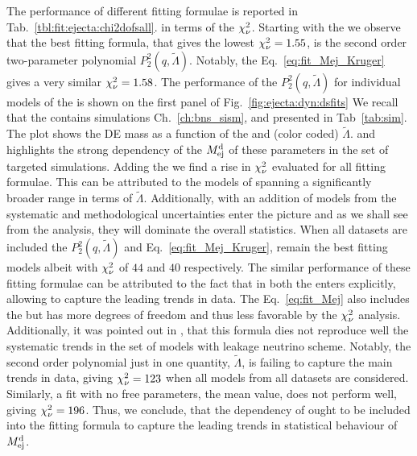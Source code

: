 The performance of different fitting formulae is reported in  
Tab.~\ref{tbl:fit:ejecta:chi2dofsall}.
in terms of the $\chi_{\nu}^2$.
Starting with the \DSrefset{} we observe that the best fitting formula, that gives the 
lowest $\chi_{\nu}^2=1.55$, is the second order two-parameter polynomial $P_2^2(q,\tilde{\Lambda})$.
Notably, the Eq.~\eqref{eq:fit_Mej_Kruger} gives a very similar $\chi_{\nu}^2=1.58$.
The performance of the $P_2^2(q,\tilde{\Lambda})$ for individual models of the \DSrefset{} 
is shown on the first panel of Fig.~\ref{fig:ejecta:dyn:dsfits}
We recall that the \DSrefset{} contains simulations Ch.~\ref{ch:bns_sism}, and presented 
in Tab~\ref{tab:sim}. 
The plot shows the \ac{DE} mass as a function of the \mr{} and (color coded) $\tilde\Lambda$.
and highlights the strong dependency of the $M^{\text{d}}_{\text{ej}}$ of these parameters in the set of targeted 
simulations. 
Adding the \DSheatcool{} we find a rise in $\chi_{\nu}^2$ evaluated for all fitting formulae. 
This can be attributed to the models of \DSheatcool{} spanning a significantly broader range 
in terms of $\tilde{\Lambda}$. Additionally, with an addition of models from \DSheatcool{} the 
systematic and methodological uncertainties enter the picture and as we shall see from the 
analysis, they will dominate the overall statistics.
When all datasets are included the $P_2^2(q,\tilde{\Lambda})$ and Eq.~\eqref{eq:fit_Mej_Kruger},
remain the best fitting models albeit with $\chi_{\nu}^2$ of $44$ and $40$ respectively.
The similar performance of these fitting formulae can be attributed to the fact that in 
both the \mr{} enters explicitly, allowing to capture the leading trends in data.
The Eq.~\eqref{eq:fit_Mej} also includes the \mr{} but has more degrees of freedom and 
thus less favorable by the $\chi_{\nu}^2$ analysis. Additionally, it was pointed out in \citet{Radice:2018pdn},
that this formula dies not reproduce well the systematic trends in the set of models with 
leakage neutrino scheme.
Notably, the second order polynomial just in one quantity, $\tilde{\Lambda}$, is failing to 
capture the main trends in data, giving $\chi_{\nu}^2=123$ when all models from all datasets are considered.
Similarly, a fit with no free parameters, the mean value, does not perform well, giving $\chi_{\nu}^2=196$.
Thus, we conclude, that the dependency of \mr{} ought to be included into the fitting formula
to capture the leading trends in statistical behaviour of $M^{\text{d}}_{\text{ej}}$.

